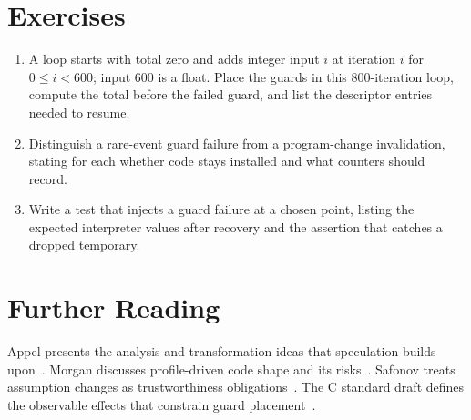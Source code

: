 \section{Exercises}\label{sec:ch35-exercises}

\begin{enumerate}
\item A loop starts with total zero and adds integer input $i$ at iteration $i$ for $0\le i<600$; input $600$ is a float. Place the guards in this $800$-iteration loop, compute the total before the failed guard, and list the descriptor entries needed to resume.\label{ex:ch35-guard-math}
\item Distinguish a rare-event guard failure from a program-change invalidation, stating for each whether code stays installed and what counters should record.\label{ex:ch35-rare-vs-change}
\item Write a test that injects a guard failure at a chosen point, listing the expected interpreter values after recovery and the assertion that catches a dropped temporary.\label{ex:ch35-inject-test}
\end{enumerate}

\section{Further Reading}\label{sec:ch35-reading}

Appel presents the analysis and transformation ideas that speculation builds upon~\cite{appel-1998-modern}.
Morgan discusses profile-driven code shape and its risks~\cite{morgan-1998-optimizing}.
Safonov treats assumption changes as trustworthiness obligations~\cite{safonov-2010-trustworthy}.
The C standard draft defines the observable effects that constrain guard placement~\cite{wg14-2011-c11}.

